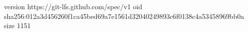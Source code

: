 version https://git-lfs.github.com/spec/v1
oid sha256:012a3d456260f1ca45bed69a7e1561d32040249893c6f0138c4a53458969bb0a
size 1151
